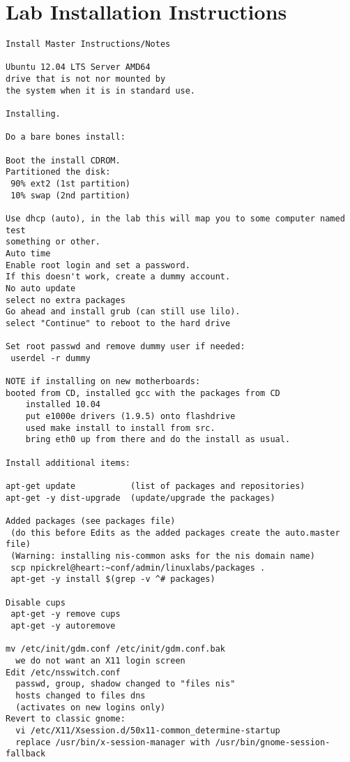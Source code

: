 \chapter{Lab Installation Instructions} \label{ap:lab_installation}

\begin{verbatim}
Install Master Instructions/Notes

Ubuntu 12.04 LTS Server AMD64
drive that is not nor mounted by
the system when it is in standard use.

Installing.

Do a bare bones install:

Boot the install CDROM.
Partitioned the disk:
 90% ext2 (1st partition)
 10% swap (2nd partition)

Use dhcp (auto), in the lab this will map you to some computer named test
something or other.
Auto time
Enable root login and set a password. 
If this doesn't work, create a dummy account.
No auto update
select no extra packages
Go ahead and install grub (can still use lilo).
select "Continue" to reboot to the hard drive

Set root passwd and remove dummy user if needed:
 userdel -r dummy
   
NOTE if installing on new motherboards:
booted from CD, installed gcc with the packages from CD
    installed 10.04 
    put e1000e drivers (1.9.5) onto flashdrive
    used make install to install from src.
    bring eth0 up from there and do the install as usual.

Install additional items:

apt-get update           (list of packages and repositories)
apt-get -y dist-upgrade  (update/upgrade the packages)

Added packages (see packages file)
 (do this before Edits as the added packages create the auto.master file)
 (Warning: installing nis-common asks for the nis domain name)
 scp npickrel@heart:~conf/admin/linuxlabs/packages .
 apt-get -y install $(grep -v ^# packages)

Disable cups
 apt-get -y remove cups
 apt-get -y autoremove

mv /etc/init/gdm.conf /etc/init/gdm.conf.bak
  we do not want an X11 login screen 
Edit /etc/nsswitch.conf
  passwd, group, shadow changed to "files nis"
  hosts changed to files dns
  (activates on new logins only)
Revert to classic gnome:
  vi /etc/X11/Xsession.d/50x11-common_determine-startup
  replace /usr/bin/x-session-manager with /usr/bin/gnome-session-fallback


\end{verbatim}
